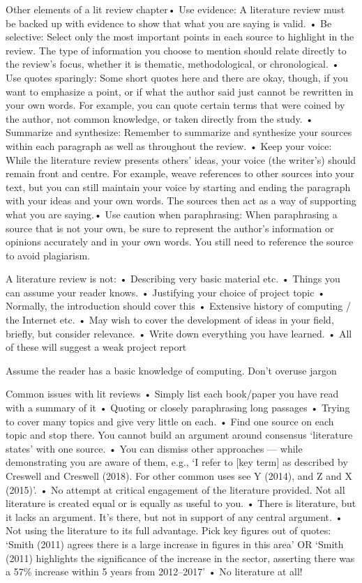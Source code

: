 {    Other elements of a lit review chapter• Use evidence: A literature review must be backed up with evidence to show that what you are saying is valid.
    • Be selective: Select only the most important points in each source to highlight in the review. The type of information you choose to mention should relate
    directly to the review's focus, whether it is thematic, methodological, or chronological.
    • Use quotes sparingly: Some short quotes here and there are okay, though, if you want to emphasize a point, or if what the author said just cannot be rewritten in your own words.
    For example, you can quote certain terms that were coined by the author, not common knowledge, or taken directly from the study.
    • Summarize and synthesize: Remember to summarize and synthesize your sources within
    each paragraph as well as throughout the review.
    • Keep your voice: While the literature review presents others' ideas, your voice (the writer's) should remain front and centre.
    For example, weave references to other sources into your text, but you can still maintain your voice by starting and ending the paragraph with your ideas and
    your own words. The sources then act as a way of supporting what you are saying.• Use caution when paraphrasing: When paraphrasing a source that is not your own, be sure to
    represent the author's information or opinions accurately and in your own words. You still need to reference the source to avoid plagiarism.

    A literature review is not:
    • Describing very basic material etc.
    • Things you can assume your reader knows.
    • Justifying your choice of project topic
    • Normally, the introduction should cover this
    • Extensive history of computing / the Internet etc.
    • May wish to cover the development of ideas in your field, briefly, but consider relevance.
    • Write down everything you have learned.
    • All of these will suggest a weak project report

    Assume the reader has a basic knowledge of computing. Don't overuse jargon

    Common issues with lit reviews
    • Simply list each book/paper you have read with a summary of it
    • Quoting or closely paraphrasing long passages
    • Trying to cover many topics and give very little on each.
    • Find one source on each topic and stop there. You cannot build an argument around consensus \enquote*{literature states} with one source.
    • You can dismiss other approaches --- while demonstrating you are aware of them, e.g., \enquote*{I refer to [key term] as described by Creswell and Creswell (2018). For other common uses see Y (2014), and Z and X (2015)}.
    • No attempt at critical engagement of the literature provided. Not all literature is created equal or is equally as useful to you.
    • There is literature, but it lacks an argument. It's there, but not in support of any central argument.
    • Not using the literature to its full advantage. Pick key figures out of quotes:
    \enquote*{Smith (2011) agrees there is a large increase in figures in this area} OR
    \enquote*{Smith (2011) highlights the significance of the increase in the sector, asserting there was a 57\% increase within 5 years from 2012--2017}
    • No literature at all!

}
